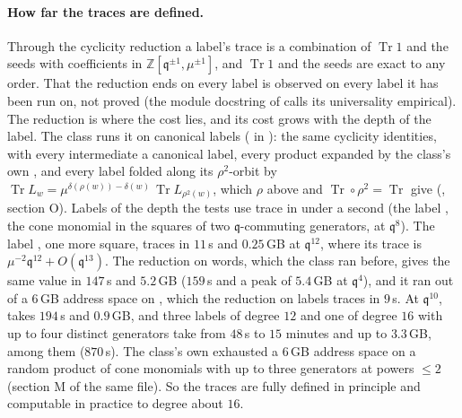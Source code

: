 \documentclass[11pt]{amsart}
\DeclareMathOperator{\Tr}{Tr}
\newcommand\fq{\mathfrak{q}}
\newcommand\bZ{\mathbb{Z}}
\theoremstyle{remark}
\begin{document}
\paragraph{How far the traces are defined.}  Through the cyclicity reduction
a label's trace is a combination of $\Tr1$ and the seeds with coefficients in
$\bZ[\fq^{\pm1},\mu^{\pm1}]$, and $\Tr1$ and the seeds are exact to any order.
That the reduction ends on every label is observed on every label it has been
run on, not proved (the module docstring of  calls its
universality empirical).  The reduction is where the cost lies, and its cost
grows with the depth of the label.  The class runs it on canonical labels
( in ): the same cyclicity
identities, with every intermediate a canonical label, every product expanded
by the class's own , and every label folded along its
$\rho^2$-orbit by $\Tr L_w=\mu^{\delta(\rho(w))-\delta(w)}\,\Tr L_{\rho^2(w)}$,
which $\rho$ above and $\Tr\circ\rho^2=\Tr$ give
(,
section O).  Labels of the depth the tests use trace in under a second (the
label , the cone monomial in the squares of two
$\fq$-commuting generators, at $\fq^8$).  The label ,
one more square, traces in $11$\,s and $0.25$\,GB at $\fq^{12}$, where its trace
is $\mu^{-2}\fq^{12}+O(\fq^{13})$.  The reduction on words, which the class ran
before, gives the same value in $147$\,s and $5.2$\,GB ($159$\,s and a peak of
$5.4$\,GB at $\fq^4$), and it ran out of a $6$\,GB address space on
, which the reduction on labels traces in $9$\,s.
At $\fq^{10}$,  takes $194$\,s and $0.9$\,GB, and three labels
of degree $12$ and one of degree $16$ with up to four distinct generators take
from $48$\,s to $15$ minutes and up to $3.3$\,GB, among them
 ($870$\,s).  The class's own  exhausted a $6$\,GB address space
on a random product of cone monomials with up to three generators at powers
$\le2$ (section M of the same file).  So the traces are fully defined in
principle and computable in practice to degree about $16$.
\end{document}
